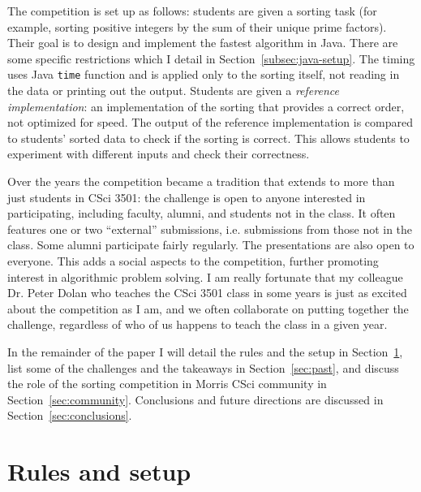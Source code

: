 \documentclass[12pt]{article}
\newcommand{\comment}[1]{}
\newcommand{\emcomment}[1]{\textcolor{ForestGreen}{\comment{Elena: {#1}}}}
\begin{document}
The competition is set up as follows: students are given a sorting task (for example, sorting positive integers by the sum of their unique prime factors). Their goal is to design and implement the fastest algorithm in Java. There are some specific restrictions which I detail in Section~\ref{subsec:java-setup}.
\emcomment{And possibly a section on the general setup, such as the timing?}
The timing uses Java {\tt time} function and is applied only to the sorting itself, not reading in the data or printing out the output. Students are given a \textit{reference implementation}: an implementation of the sorting that provides a correct order, not optimized for speed. The output of the reference implementation is compared to students' sorted data to check if the sorting is correct. This allows students to experiment with different inputs and check their correctness.  

Over the years the competition became a tradition that extends to more than just students in CSci 3501: the challenge is open to anyone interested in participating, including faculty, alumni, and students not in the class. It often features one or two ``external'' submissions, i.e. submissions from those not in the class. Some alumni participate fairly regularly. The presentations are also open to everyone. This adds a social aspects to the competition, further promoting interest in algorithmic problem solving. I am really fortunate that my colleague Dr. Peter Dolan who teaches the CSci 3501 class in some years is just as excited about the competition as I am, and we often collaborate on putting together the challenge, regardless of who of us happens to teach the class in a given year.  

In the remainder of the paper I will detail the rules and the setup in Section~\ref{sec:rules}, list some of the challenges and the takeaways in Section~\ref{sec:past}, and discuss the role of the sorting competition in Morris CSci community in Section~\ref{sec:community}. Conclusions and future directions are discussed in Section~\ref{sec:conclusions}.

\section{Rules and setup}\label{sec:rules}
\end{document}
